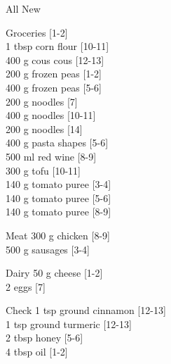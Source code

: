 \begin{menu}{All New}
\begin{shoppinglist}{Groceries}
        {\scriptsize[1-2]}\\
      1 tbsp corn flour 
        {\scriptsize[10-11]}\\
      400 g cous cous 
        {\scriptsize[12-13]}\\
      200 g frozen peas 
        {\scriptsize[1-2]}\\
      400 g frozen peas 
        {\scriptsize[5-6]}\\
      200 g noodles 
        {\scriptsize[7]}\\
      400 g noodles 
        {\scriptsize[10-11]}\\
      200 g noodles 
        {\scriptsize[14]}\\
      400 g pasta shapes 
        {\scriptsize[5-6]}\\
      500 ml red wine 
        {\scriptsize[8-9]}\\
      300 g tofu 
        {\scriptsize[10-11]}\\
      140 g tomato puree 
        {\scriptsize[3-4]}\\
      140 g tomato puree 
        {\scriptsize[5-6]}\\
      140 g tomato puree 
        {\scriptsize[8-9]}\\
      \end{shoppinglist}%
      \par\vfil %
      \begin{shoppinglist}{Meat}
      300 g chicken 
        {\scriptsize[8-9]}\\
      500 g sausages 
        {\scriptsize[3-4]}\\
      \end{shoppinglist}%
      \begin{shoppinglist}{Dairy}
      50 g cheese 
        {\scriptsize[1-2]}\\
      2  eggs 
        {\scriptsize[7]}\\
      \end{shoppinglist}%
      \par\vfil %
      \vfil\clearpage %
      \begin{shoppinglist}{Check}
      1 tsp ground cinnamon 
        {\scriptsize[12-13]}\\
      1 tsp ground turmeric 
        {\scriptsize[12-13]}\\
      2 tbsp honey 
        {\scriptsize[5-6]}\\
      4 tbsp oil 
        {\scriptsize[1-2]}\\

\end{shoppinglist}
\end{menu}
